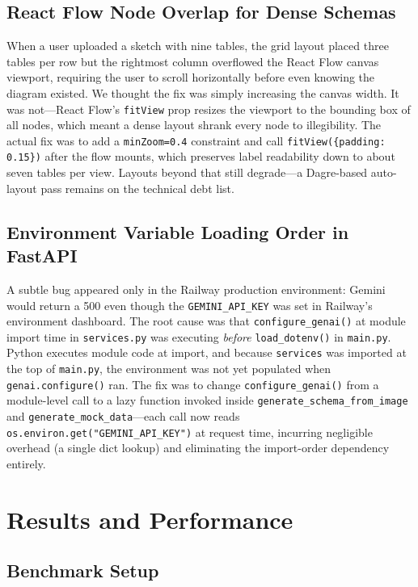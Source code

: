 \documentclass[conference]{IEEEtran}
\begin{document}
\subsection{React Flow Node Overlap for Dense Schemas}

When a user uploaded a sketch with nine tables, the grid layout
placed three tables per row but the rightmost column overflowed
the React Flow canvas viewport, requiring the user to scroll
horizontally before even knowing the diagram existed. We thought
the fix was simply increasing the canvas width. It was not---React
Flow's \texttt{fitView} prop resizes the viewport to the bounding
box of all nodes, which meant a dense layout shrank every node
to illegibility. The actual fix was to add a \texttt{minZoom=0.4}
constraint and call \texttt{fitView(\{padding: 0.15\})} after
the flow mounts, which preserves label readability down to about
seven tables per view. Layouts beyond that still degrade---a
Dagre-based auto-layout pass remains on the technical debt list.

\subsection{Environment Variable Loading Order in FastAPI}

A subtle bug appeared only in the Railway production environment:
Gemini would return a 500 even though the \texttt{GEMINI\_API\_KEY}
was set in Railway's environment dashboard. The root cause was that
\texttt{configure\_genai()} at module import time in
\texttt{services.py} was executing \emph{before}
\texttt{load\_dotenv()} in \texttt{main.py}. Python executes module
code at import, and because \texttt{services} was imported at the
top of \texttt{main.py}, the environment was not yet populated when
\texttt{genai.configure()} ran. The fix was to change
\texttt{configure\_genai()} from a module-level call to a lazy
function invoked inside \texttt{generate\_schema\_from\_image} and
\texttt{generate\_mock\_data}---each call now reads
\texttt{os.environ.get("GEMINI\_API\_KEY")} at request time,
incurring negligible overhead (a single dict lookup) and eliminating
the import-order dependency entirely.

\section{Results and Performance}

\subsection{Benchmark Setup}
\end{document}
